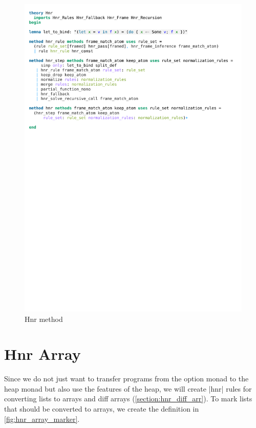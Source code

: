 \begin{figure}[htpb]
    \includegraphics[trim={0 18,5cm 0 9,8cm}, clip, width=1.00\textwidth]{figures/Theory_Hnr.pdf}
    \caption[Hnr method]{Hnr method}
    \label{fig:hnr_method}
\end{figure}

\section{Hnr Array}\label{section:hnr_arr}

Since we do not just want to transfer programs from the option monad to the heap monad but also use the features of the heap, we will create |hnr| rules for converting lists to arrays and diff arrays (\autoref{section:hnr_diff_arr}). 
To mark lists that should be converted to arrays, we create the definition in \autoref{fig:hnr_array_marker}.

